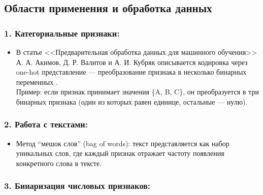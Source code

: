 \hypertarget{ux43eux431ux43bux430ux441ux442ux438-ux43fux440ux438ux43cux435ux43dux435ux43dux438ux44f-ux438-ux43eux431ux440ux430ux431ux43eux442ux43aux430-ux434ux430ux43dux43dux44bux445}{%
\subsection*{Области применения и обработка
данных}\label{ux43eux431ux43bux430ux441ux442ux438-ux43fux440ux438ux43cux435ux43dux435ux43dux438ux44f-ux438-ux43eux431ux440ux430ux431ux43eux442ux43aux430-ux434ux430ux43dux43dux44bux445}}

\hypertarget{ux43aux430ux442ux435ux433ux43eux440ux438ux430ux43bux44cux43dux44bux435-ux43fux440ux438ux437ux43dux430ux43aux438}{%
\subsubsection*{1. Категориальные
признаки:}\label{ux43aux430ux442ux435ux433ux43eux440ux438ux430ux43bux44cux43dux44bux435-ux43fux440ux438ux437ux43dux430ux43aux438}}

\begin{itemize}
\tightlist
\item
   В статье <<Предварительная обработка данных для машинного обучения>> А. А. Акимов, Д. Р. Валитов и А. И. Кубряк описывается
  кодировка через one-hot представление --- преобразование
  признака в несколько бинарных переменных \cite{акимов2022предварительная}.\\
  Пример: если признак принимает значения \{A, B, C\}, он преобразуется
  в три бинарных признака (один из которых равен единице, остальные ---
  нулю).
\end{itemize}

\hypertarget{ux440ux430ux431ux43eux442ux430-ux441-ux442ux435ux43aux441ux442ux430ux43cux438}{%
\subsubsection*{2. Работа с
текстами:}\label{ux440ux430ux431ux43eux442ux430-ux441-ux442ux435ux43aux441ux442ux430ux43cux438}}

\begin{itemize}
\tightlist
\item
  Метод ``мешок слов'' (bag of words): текст представляется как набор
  уникальных слов, где каждый признак отражает частоту появления
  конкретного слова в тексте.
\end{itemize}

\hypertarget{ux431ux438ux43dux430ux440ux438ux437ux430ux446ux438ux44f-ux447ux438ux441ux43bux43eux432ux44bux445-ux43fux440ux438ux437ux43dux430ux43aux43eux432}{%
\subsubsection*{3. Бинаризация числовых
признаков:}\label{ux431ux438ux43dux430ux440ux438ux437ux430ux446ux438ux44f-ux447ux438ux441ux43bux43eux432ux44bux445-ux43fux440ux438ux437ux43dux430ux43aux43eux432}}

